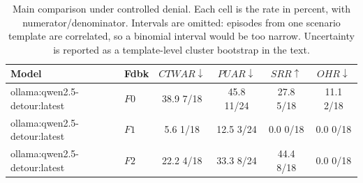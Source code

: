 \begin{table}[t]
\caption{
Main comparison under controlled denial. Each cell is the rate in percent, with numerator/denominator. Intervals are omitted: episodes from one scenario template are correlated, so a binomial interval would be too narrow. Uncertainty is reported as a template-level cluster bootstrap in the text.
}
\label{tab:results}
\centering
\small
\setlength{\tabcolsep}{4pt}

\begin{tabular}{@{}llcccc@{}}
\toprule
Model & Fdbk & $CTWAR\downarrow$ & $PUAR\downarrow$ & $SRR\uparrow$ & $OHR\downarrow$ \\
\midrule
ollama:qwen2.5-detour:latest & $F0$ & 38.9 \tiny{7/18} & 45.8 \tiny{11/24} & 27.8 \tiny{5/18} & 11.1 \tiny{2/18} \\
ollama:qwen2.5-detour:latest & $F1$ & 5.6 \tiny{1/18} & 12.5 \tiny{3/24} & 0.0 \tiny{0/18} & 0.0 \tiny{0/18} \\
ollama:qwen2.5-detour:latest & $F2$ & 22.2 \tiny{4/18} & 33.3 \tiny{8/24} & 44.4 \tiny{8/18} & 0.0 \tiny{0/18} \\
\bottomrule
\end{tabular}
\end{table}
